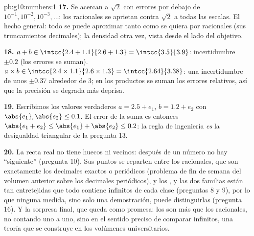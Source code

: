 \begin{solution}{pb:g10:numbers:1}
\textbf{17.} Se acercan a $\sqrt2$ con errores por debajo de
$10^{-1}, 10^{-2}, 10^{-3}, \dots$: los racionales se aprietan contra
$\sqrt2$ a todas las escalas. El hecho general: todo  se puede
aproximar tanto como se quiera por racionales (sus truncamientos
decimales); la densidad otra vez, vista desde el lado del objetivo.

\textbf{18.} $a + b \in \intcc{2.4 + 1.1}{2.6 + 1.3} =
\intcc{3.5}{3.9}$: incertidumbre $\pm 0.2$ (los errores se suman).
$a \times b \in \intcc{2.4 \times 1.1}{2.6 \times 1.3} =
\intcc{2.64}{3.38}$: una incertidumbre de unos $\pm 0.37$ alrededor de
$3$; en los productos se suman los errores relativos, así que la precisión
se degrada más deprisa.

\textbf{19.} Escribimos los valores verdaderos $a = 2.5 + e_1$,
$b = 1.2 + e_2$ con $\abs{e_1}, \abs{e_2} \leq 0.1$. El error de la suma
es entonces $\abs{e_1 + e_2} \leq \abs{e_1} + \abs{e_2} \leq 0.2$: la
regla de ingeniería \emph{es} la desigualdad triangular de la
pregunta 13.

\textbf{20.} La recta real no tiene huecos ni vecinos: después de un
número no hay ``siguiente'' (pregunta 10). Sus puntos se reparten entre
los racionales, que son exactamente los decimales exactos o periódicos
(problema de fin de semana del volumen anterior sobre los decimales
periódicos), y los , y las dos familias están tan entretejidas
que todo  contiene infinitos de cada clase (preguntas 8 y 9), por
lo que ninguna medida, sino solo una demostración, puede distinguirlas
(pregunta 16). Y la sorpresa final, que queda como promesa: los
 son más que los racionales, no contando uno a uno, sino en el
sentido preciso de comparar infinitos, una teoría que se construye en los
volúmenes universitarios.
\end{solution}
